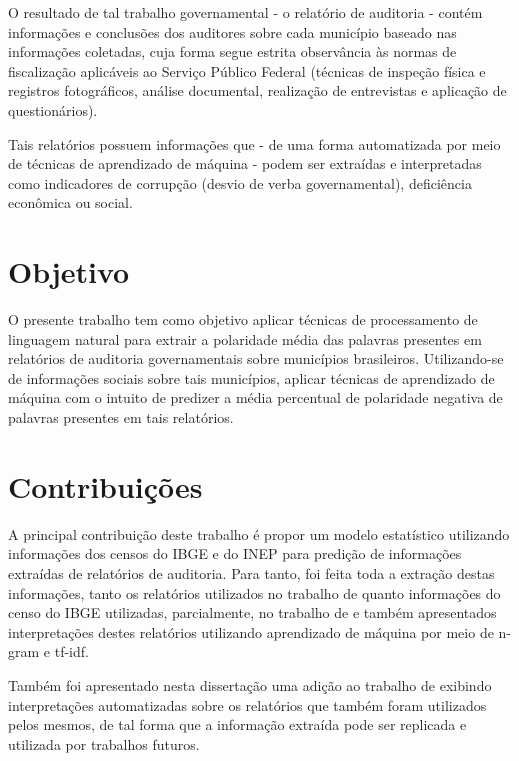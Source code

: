 O resultado de tal trabalho governamental - o relatório de auditoria - contém informações e conclusões dos auditores sobre cada município baseado nas informações coletadas, cuja forma segue estrita observância às normas de fiscalização aplicáveis ao Serviço Público Federal (técnicas de inspeção física e registros fotográficos, análise documental, realização de entrevistas e aplicação de questionários).

Tais relatórios possuem informações que - de uma forma automatizada por meio de técnicas de aprendizado de máquina - podem ser extraídas e interpretadas como indicadores de corrupção (desvio de verba governamental), deficiência econômica ou social.

\section{Objetivo}
\label{sec:objetivo}

O presente trabalho tem como objetivo aplicar técnicas de processamento de linguagem natural para extrair a polaridade média das palavras presentes em relatórios de auditoria governamentais sobre municípios brasileiros. Utilizando-se de informações sociais sobre tais municípios, aplicar técnicas de aprendizado de máquina com o intuito de predizer a média percentual de polaridade negativa de palavras presentes em tais relatórios.

\section{Contribuições}
\label{sec:contribuicoes}

A principal contribuição deste trabalho é propor um modelo estatístico utilizando informações dos censos do IBGE e do INEP para predição de informações extraídas de relatórios de auditoria. Para tanto, foi feita toda a extração destas informações, tanto os relatórios utilizados no trabalho de \citet{FerrazFinan2008} quanto informações do censo do IBGE utilizadas, parcialmente, no trabalho de \citet{Goldani2001} e também apresentados interpretações destes relatórios utilizando aprendizado de máquina por meio de n-gram e tf-idf.

Também foi apresentado nesta dissertação uma adição ao trabalho de \citet{FerrazFinan2008} exibindo interpretações automatizadas sobre os relatórios que também foram utilizados pelos mesmos, de tal forma que a informação extraída pode ser replicada e utilizada por trabalhos futuros.

